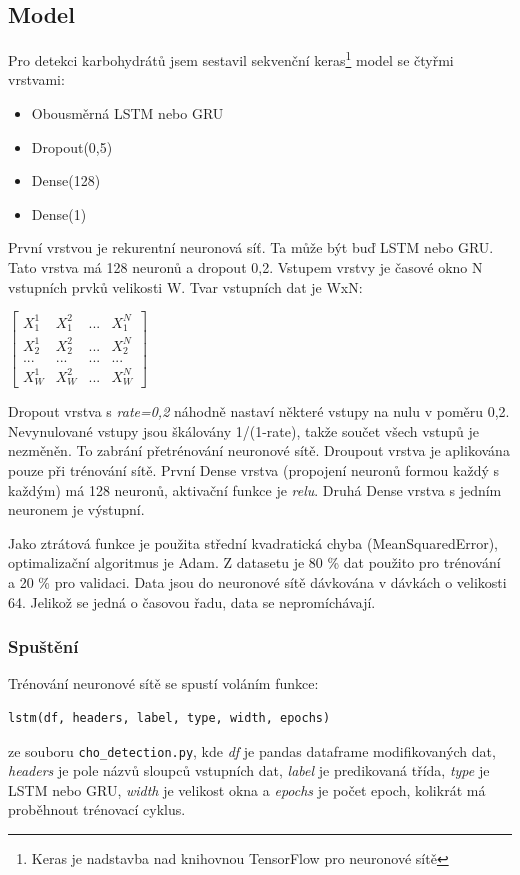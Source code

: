 \subsection{Model}

Pro detekci karbohydrátů jsem sestavil sekvenční keras\footnote{Keras je nadstavba nad knihovnou TensorFlow pro neuronové sítě} model se čtyřmi vrstvami:
\begin{itemize}
\setlength\itemsep{0em}
\item Obousměrná LSTM nebo GRU
\item Dropout(0,5)
\item Dense(128)
\item Dense(1)
\end{itemize}

První vrstvou je rekurentní neuronová síť. Ta může být buď LSTM nebo GRU. Tato vrstva má 128 neuronů a dropout 0,2. Vstupem vrstvy je časové okno N vstupních prvků velikosti W. Tvar vstupních dat je WxN:

$\begin{bmatrix}
X^{1}_{1} & X^{2}_{1} & ... & X^{N}_{1}\\
X^{1}_{2} & X^{2}_{2} & ... & X^{N}_{2}\\
... & ... & ... & ...\\
X^{1}_{W} & X^{2}_{W} & ... & X^{N}_{W}
\end{bmatrix}$

Dropout vrstva s \textit{rate=0,2} náhodně nastaví některé vstupy na nulu v poměru 0,2. Nevynulované vstupy jsou škálovány 1/(1-rate), takže součet všech vstupů je nezměněn. To zabrání přetrénování neuronové sítě. Droupout vrstva je aplikována pouze při trénování sítě. První Dense vrstva (propojení neuronů formou každý s každým) má 128 neuronů, aktivační funkce je \textit{relu}. Druhá Dense vrstva s jedním neuronem je výstupní.

Jako ztrátová funkce je použita střední kvadratická chyba (MeanSquaredError), optimalizační algoritmus je Adam. Z datasetu je 80 \% dat použito pro trénování a 20 \% pro validaci. Data jsou do neuronové sítě dávkována v dávkách o velikosti 64. Jelikož se jedná o časovou řadu, data se nepromíchávají.

\subsubsection{Spuštění}

Trénování neuronové sítě se spustí voláním funkce:
\begin{verbatim}
lstm(df, headers, label, type, width, epochs)
\end{verbatim}
ze souboru \texttt{cho\_detection.py}, kde \textit{df} je pandas dataframe modifikovaných dat, \textit{headers} je pole názvů sloupců vstupních dat, \textit{label} je predikovaná třída, \textit{type} je LSTM nebo GRU, \textit{width} je velikost okna a \textit{epochs} je počet epoch, kolikrát má proběhnout trénovací cyklus.


